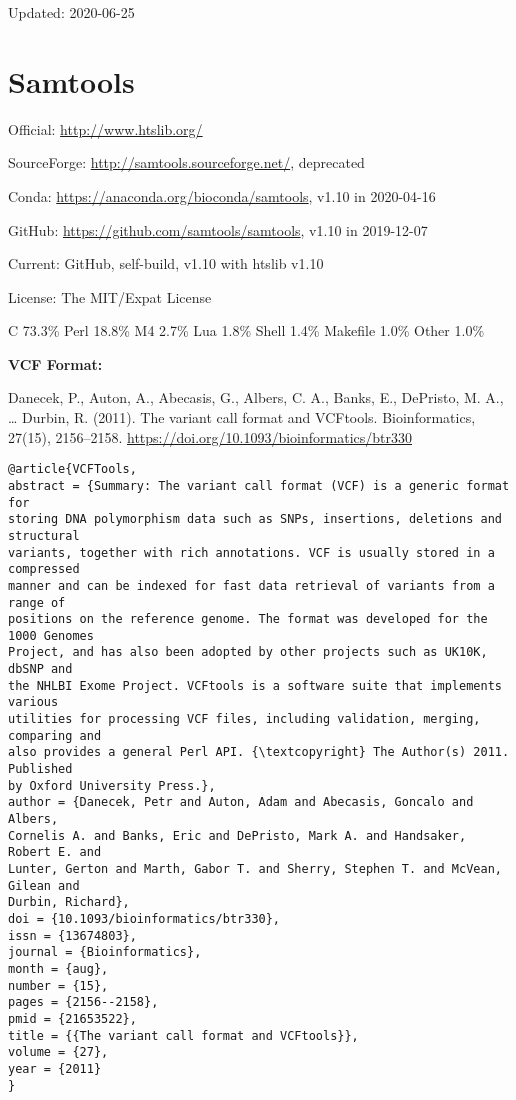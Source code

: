 \documentclass[]{article}
\begin{document}
Updated: 2020-06-25

\section{Samtools}

Official: \url{http://www.htslib.org/}

SourceForge: \url{http://samtools.sourceforge.net/}, deprecated

Conda: \url{https://anaconda.org/bioconda/samtools}, v1.10 in 2020-04-16

GitHub: \url{https://github.com/samtools/samtools}, v1.10 in 2019-12-07

Current: GitHub, self-build, v1.10 with htslib v1.10

License: The MIT/Expat License

C 73.3\% Perl 18.8\% M4 2.7\% Lua 1.8\% Shell 1.4\% Makefile 1.0\% Other 1.0\%

\textbf{VCF Format:}

Danecek, P., Auton, A., Abecasis, G., Albers, C. A., Banks, E., DePristo, M. A., … Durbin, R. (2011). The variant call format and VCFtools. Bioinformatics, 27(15), 2156–2158. \url{https://doi.org/10.1093/bioinformatics/btr330}

\begin{verbatim}
@article{VCFTools,
abstract = {Summary: The variant call format (VCF) is a generic format for
storing DNA polymorphism data such as SNPs, insertions, deletions and structural
variants, together with rich annotations. VCF is usually stored in a compressed
manner and can be indexed for fast data retrieval of variants from a range of
positions on the reference genome. The format was developed for the 1000 Genomes
Project, and has also been adopted by other projects such as UK10K, dbSNP and
the NHLBI Exome Project. VCFtools is a software suite that implements various
utilities for processing VCF files, including validation, merging, comparing and
also provides a general Perl API. {\textcopyright} The Author(s) 2011. Published
by Oxford University Press.},
author = {Danecek, Petr and Auton, Adam and Abecasis, Goncalo and Albers,
Cornelis A. and Banks, Eric and DePristo, Mark A. and Handsaker, Robert E. and
Lunter, Gerton and Marth, Gabor T. and Sherry, Stephen T. and McVean, Gilean and
Durbin, Richard},
doi = {10.1093/bioinformatics/btr330},
issn = {13674803},
journal = {Bioinformatics},
month = {aug},
number = {15},
pages = {2156--2158},
pmid = {21653522},
title = {{The variant call format and VCFtools}},
volume = {27},
year = {2011}
}
\end{verbatim}
\end{document}
